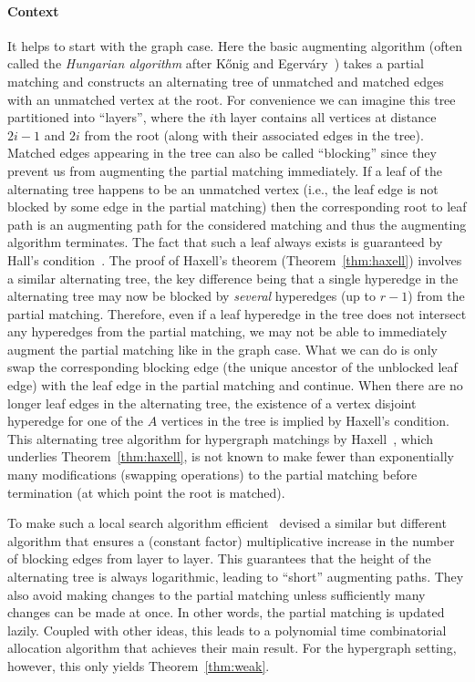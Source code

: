 \documentclass[11pt]{article}
\theoremstyle{definition}
\theoremstyle{remark}
\begin{document}
\paragraph{Context} It helps to start with the graph case. Here the
basic augmenting algorithm (often called the \emph{Hungarian
  algorithm} after K\H onig and
Egerv\'ary~\cite{west2001introduction}) takes a partial matching and
constructs an alternating tree of unmatched and matched edges with an
unmatched vertex at the root. For convenience we can imagine this tree
partitioned into ``layers'', where the $i$th layer contains all vertices
at distance $2i-1$ and $2i$ from the root (along with their associated
edges in the tree). Matched edges appearing in the tree can also be
called ``blocking'' since they prevent us from augmenting the partial
matching immediately. If a leaf of the alternating tree happens to be
an unmatched vertex (i.e., the leaf edge is not blocked by some edge
in the partial matching) then the corresponding root to leaf path is
an augmenting path for the considered matching and thus the augmenting
algorithm terminates. The fact that such a leaf always exists is
guaranteed by Hall's condition~\cite{hall1935representatives}. The
proof of Haxell's theorem (Theorem~\ref{thm:haxell}) involves a
similar alternating tree, the key difference being that a single
hyperedge in the alternating tree may now be blocked by \emph{several}
hyperedges (up to $r-1$) from the partial matching. Therefore, even if
a leaf hyperedge in the tree does not intersect any hyperedges from
the partial matching, we may not be able to immediately augment the
partial matching like in the graph case. What we can do is only swap
the corresponding blocking edge (the unique ancestor of the unblocked
leaf edge) with the leaf edge in the partial matching and
continue. When there are no longer leaf edges in the alternating tree,
the existence of a vertex disjoint hyperedge for one of the $A$
vertices in the tree is implied by Haxell's condition. This
alternating tree algorithm for hypergraph matchings by
Haxell~\cite{haxell1995condition}, which underlies
Theorem~\ref{thm:haxell}, is not known to make fewer than
exponentially many modifications (swapping operations) to the partial
matching before termination (at which point the root is matched).

To make such a local search algorithm
efficient~\cite{DBLP:conf/soda/AnnamalaiKS15} devised a similar but
different algorithm that ensures a (constant factor) multiplicative
increase in the number of blocking edges from layer to layer. This
guarantees that the height of the alternating tree is always
logarithmic, leading to ``short'' augmenting paths. They also avoid
making changes to the partial matching unless sufficiently many
changes can be made at once. In other words, the partial matching is
updated lazily. Coupled with other ideas, this leads to a polynomial
time combinatorial allocation algorithm that achieves their main
result. For the hypergraph setting, however, this only yields
Theorem~\ref{thm:weak}.
\end{document}
